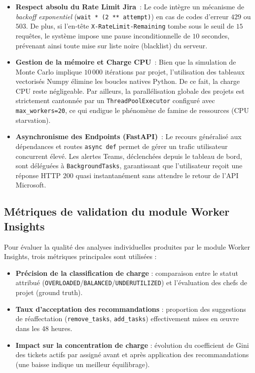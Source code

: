 \begin{itemize}
    \renewcommand{\labelitemi}{—}
    \item \textbf{Respect absolu du Rate Limit Jira}~: Le code intègre un mécanisme de \textit{backoff exponentiel} (\texttt{wait * (2 ** attempt)}) en cas de codes d’erreur $429$ ou $503$. De plus, si l’en‑tête \texttt{X-RateLimit-Remaining} tombe sous le seuil de $15$ requêtes, le système impose une pause inconditionnelle de $10$ secondes, prévenant ainsi toute mise sur liste noire (blacklist) du serveur.
    
    \item \textbf{Gestion de la mémoire et Charge CPU}~: Bien que la simulation de Monte Carlo implique $10\,000$ itérations par projet, l’utilisation des tableaux vectorisés Numpy élimine les boucles natives Python. De ce fait, la charge CPU reste négligeable. Par ailleurs, la parallélisation globale des projets est strictement cantonnée par un \texttt{ThreadPoolExecutor} configuré avec \texttt{max\_workers=20}, ce qui endigue le phénomène de famine de ressources (CPU starvation).
    
    \item \textbf{Asynchronisme des Endpoints (FastAPI)}~: Le recours généralisé aux dépendances et routes \texttt{async def} permet de gérer un trafic utilisateur concurrent élevé. Les alertes Teams, déclenchées depuis le tableau de bord, sont déléguées à \texttt{BackgroundTasks}, garantissant que l’utilisateur reçoit une réponse HTTP $200$ quasi instantanément sans attendre le retour de l’API Microsoft.
\end{itemize}

\subsection{Métriques de validation du module Worker Insights}

Pour évaluer la qualité des analyses individuelles produites par le module Worker Insights, trois métriques principales sont utilisées :

\begin{itemize}
    \renewcommand{\labelitemi}{—}
    \item \textbf{Précision de la classification de charge} : comparaison entre le statut attribué (\texttt{OVERLOADED}/\texttt{BALANCED}/\texttt{UNDERUTILIZED}) et l’évaluation des chefs de projet (ground truth).
    \item \textbf{Taux d’acceptation des recommandations} : proportion des suggestions de réaffectation (\texttt{remove\_tasks}, \texttt{add\_tasks}) effectivement mises en œuvre dans les 48 heures.
    \item \textbf{Impact sur la concentration de charge} : évolution du coefficient de Gini des tickets actifs par assigné avant et après application des recommandations (une baisse indique un meilleur équilibrage).
\end{itemize}

